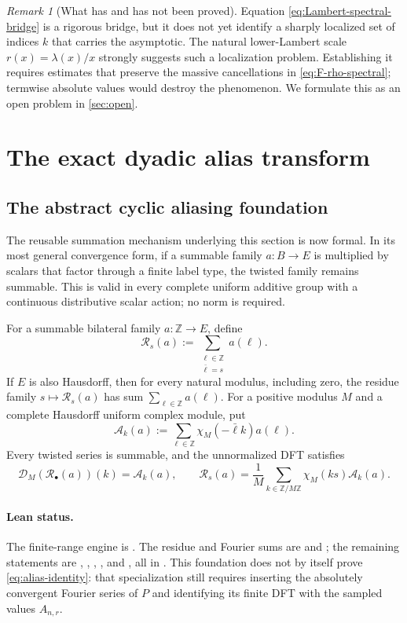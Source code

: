 \documentclass[11pt,oneside]{article}
\theoremstyle{definition}
\theoremstyle{remark}
\newtheorem{remark}[theorem]{Remark}
\newcommand{\Z}{\mathbb Z}
\begin{document}
\begin{remark}[What has and has not been proved]
Equation \eqref{eq:Lambert-spectral-bridge} is a rigorous bridge, but it does not
yet identify a sharply localized set of indices $k$ that carries the asymptotic.
The natural lower-Lambert scale $r(x)=\lambda(x)/x$ strongly suggests such a
localization problem.  Establishing it requires estimates that preserve the
massive cancellations in \eqref{eq:F-rho-spectral}; termwise absolute values
would destroy the phenomenon.  We formulate this as an open problem in
\cref{sec:open}.
\end{remark}

\section{The exact dyadic alias transform}\label{sec:dct}

\subsection{The abstract cyclic aliasing foundation}

The reusable summation mechanism underlying this section is now formal.  In
its most general convergence form, if a summable family \(a:B\to E\) is
multiplied by scalars that factor through a finite label type, the twisted
family remains summable.  This is valid in every complete uniform additive
group with a continuous distributive scalar action; no norm is required.

For a summable bilateral family \(a:\Z\to E\), define
\[
 \mathcal R_s(a):=\sum_{\substack{\ell\in\Z\\\bar\ell=s}}a(\ell).
\]
If \(E\) is also Hausdorff, then for every natural modulus, including zero,
the residue family
\(s\mapsto\mathcal R_s(a)\) has sum \(\sum_{\ell\in\Z}a(\ell)\).
For a positive modulus \(M\) and a complete Hausdorff uniform complex
module, put
\[
 \mathcal A_k(a):=
 \sum_{\ell\in\Z}\chi_M(-\bar\ell k)a(\ell).
\]
Every twisted series is summable, and the unnormalized DFT satisfies
\[
 \mathcal D_M(\mathcal R_\bullet(a))(k)=\mathcal A_k(a),
 \qquad
 \mathcal R_s(a)=\frac1M\sum_{k\in\Z/M\Z}
   \chi_M(ks)\mathcal A_k(a).
\]

\paragraph{Lean status.}
The finite-range engine is
.  The residue and Fourier sums are
 and ; the remaining
statements are
,
,
,
, and
, all in
.  This foundation does not by itself prove
\eqref{eq:alias-identity}: that specialization still requires inserting the
absolutely convergent Fourier series of \(P\) and identifying its finite DFT
with the sampled values \(A_{n,r}\).
\end{document}
